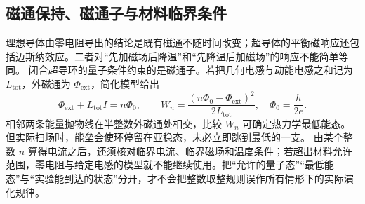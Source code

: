 {\subsection{磁通保持、磁通子与材料临界条件}
理想导体由零电阻导出的结论是既有磁通不随时间改变；超导体的平衡磁响应还包括迈斯纳效应。二者对“先加磁场后降温”和“先降温后加磁场”的响应不能简单等同。
闭合超导环的量子条件约束的是磁通子。若把几何电感与动能电感之和记为 $L_{\mathrm{tot}}$，外磁通为 $\Phi_{\mathrm{ext}}$，简化模型给出
\[
 \Phi_{\mathrm{ext}}+L_{\mathrm{tot}}I=n\Phi_0,\qquad
 W_n=\frac{(n\Phi_0-\Phi_{\mathrm{ext}})^2}{2L_{\mathrm{tot}}},\quad
 \Phi_0=\frac{h}{2e}.
\]
相邻两条能量抛物线在半整数外磁通处相交，比较 $W_n$ 可确定热力学最低能态。但实际扫场时，能垒会使环停留在亚稳态，未必立即跳到最低的一支。
由某个整数 $n$ 算得电流之后，还须核对临界电流、临界磁场和温度条件；若超出材料允许范围，零电阻与给定电感的模型就不能继续使用。把“允许的量子态”“最低能态”与“实验能到达的状态”分开，才不会把整数取整规则误作所有情形下的实际演化规律。
}

\endgroup
